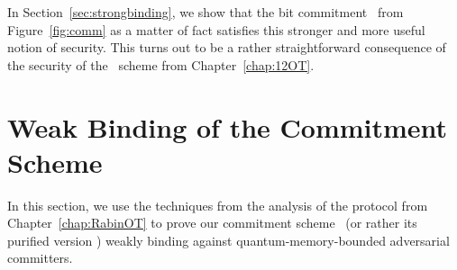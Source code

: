 
In Section~\ref{sec:strongbinding}, we show that the bit commitment
\comm\ from Figure~\ref{fig:comm} as a matter of fact satisfies this
stronger and more useful notion of security. This turns out to be a
rather straightforward consequence of the security of the \OT\ scheme
from Chapter~\ref{chap:12OT}.


\section{Weak Binding of the Commitment Scheme} \label{sec:weakbinding}
 In this section, we use the
techniques from the analysis of the \RabinOT protocol from
Chapter~\ref{chap:RabinOT} to prove our commitment scheme \comm\ (or
rather its purified version \eprcomm) weakly binding against
quantum-memory-bounded adversarial committers.

